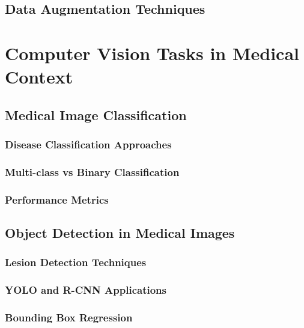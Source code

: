 \documentclass[12pt,a4paper]{report}
\begin{document}
\subsection{Data Augmentation Techniques}

\section{Computer Vision Tasks in Medical Context}

\subsection{Medical Image Classification}

\subsubsection{Disease Classification Approaches}

\subsubsection{Multi-class vs Binary Classification}

\subsubsection{Performance Metrics}

\subsection{Object Detection in Medical Images}

\subsubsection{Lesion Detection Techniques}

\subsubsection{YOLO and R-CNN Applications}

\subsubsection{Bounding Box Regression}
\end{document}
